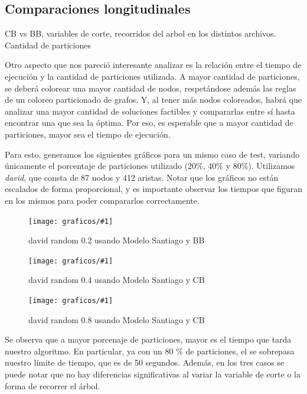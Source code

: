 \documentclass[a4paper, 10pt, twoside]{article}
\newcommand{\diagramavfig}[2]{%
  \begin{figure}[H]
    \texttt{[image: graficos/\#1]}%
    \caption{#2}
    \label{fig:#1}
  \end{figure}
}
\begin{document}
\subsection{Comparaciones longitudinales}

CB vs BB, variables de corte, recorridos del arbol en los distintos archivos. Cantidad de particiones



Otro aspecto que nos pareció interesante analizar es la relación entre el tiempo de ejecución y la cantidad de particiones utilizada. A mayor cantidad de particiones, se deberá colorear una mayor cantidad de nodos, respetándose además las reglas de un coloreo particionado de grafos. Y, al tener más nodos coloreados, habrá que analizar una mayor cantidad de soluciones factibles y compararlas entre sí hasta encontrar una que sea la óptima. Por eso, es esperable que a mayor cantidad de particiones, mayor sea el tiempo de ejecución.

Para esto, generamos los siguientes gráficos para un mismo caso de test, variando únicamente el porcentaje de particiones utilizado (20\%, 40\% y 80\%). Utilizamos \emph{david}, que consta de 87 nodos y 412 aristas. Notar que los gráficos no están escalados de forma proporcional, y es importante observar los tiempos que figuran en los mismos para poder compararlos correctamente.

\diagramavfig{david_random_0.2_bb_0_segunJuntada}{david random 0.2 usando Modelo Santiago y BB}
\diagramavfig{david_random_0.4_bb_0_segunJuntada}{david random 0.4 usando Modelo Santiago y CB}
\diagramavfig{david_random_0.8_bb_0_segunJuntada}{david random 0.8 usando Modelo Santiago y CB}

Se observa que a mayor porcenaje de particiones, mayor es el tiempo que tarda nuestro algoritmo. En particular, ya con un 80 \% de particiones, el se sobrepasa nuestro límite de tiempo, que es de 50 segundos. Además, en los tres casos se puede notar que no hay diferencias significativas al variar la variable de corte o la forma de recorrer el árbol.

	


\end{document}
